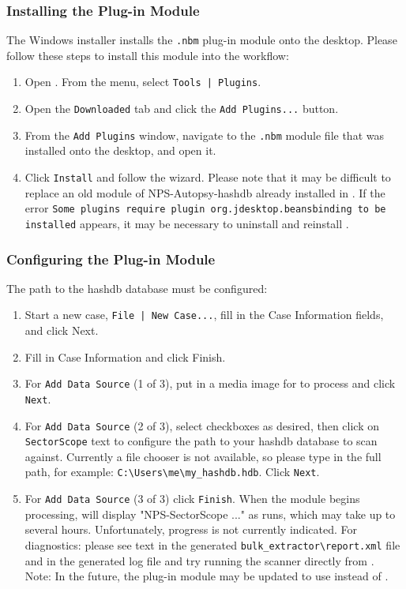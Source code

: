 \documentclass[11pt,fleqn]{article} %
\begin{document}
\subsubsection{Installing the \sscope \aut Plug-in Module}
\label{installingNBM}
The \sscope Windows installer installs the \verb+.nbm+ \sscope \aut plug-in module onto the desktop. Please follow these steps to install this module into the \aut workflow:
\begin{enumerate}
\item Open \aut. From the \aut menu, select \verb+Tools | Plugins+.
\item Open the \verb+Downloaded+ tab and click the \verb+Add Plugins...+ button.
\item From the \verb+Add Plugins+ window, navigate to the \verb+.nbm+ module file that was installed onto the desktop, and open it.
\item Click \verb+Install+ and follow the wizard. Please note that it may be difficult to replace an old module of NPS-Autopsy-hashdb already installed in \aut. If the error \verb+Some plugins require plugin org.jdesktop.beansbinding to be installed+ appears, it may be necessary to uninstall and reinstall \aut.
\end{enumerate}

\subsubsection{Configuring the \sscope \aut Plug-in Module}
\label{configuringNBM}
The path to the hashdb database must be configured:
\begin{enumerate}
\item Start a new case, \verb+File | New Case...+, fill in the Case Information fields, and click Next.
\item Fill in Case Information and click Finish.
\item For \verb+Add Data Source+ (1 of 3), put in a media image for \aut to process and click \verb+Next+.
\item For \verb+Add Data Source+ (2 of 3), select checkboxes as desired, then click on \verb+SectorScope+ text to configure the path to your hashdb database to scan against. Currently a file chooser is not available, so please type in the full path, for example: \verb+C:\Users\me\my_hashdb.hdb+. Click \verb+Next+.
\item For \verb+Add Data Source+ (3 of 3) click \verb+Finish+. When the \sscope module begins processing, \aut will display "NPS-SectorScope ..." as \bulk runs, which may take up to several hours. Unfortunately, \bulk progress is not currently indicated. For diagnostics: please see text in the generated \verb+bulk_extractor\report.xml+ file and in the generated log file and try running the \bulk scanner directly from \sscope.\\

Note: In the future, the \sscope \aut plug-in module may be updated to use \hdb instead of \bulk.
\end{enumerate}
\end{document}
